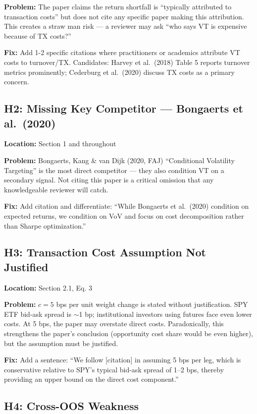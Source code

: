 \documentclass[12pt,a4paper]{article}
\begin{document}
\textbf{Problem:} The paper claims the return shortfall is ``typically attributed to transaction costs'' but does not cite any specific paper making this attribution. This creates a straw man risk --- a reviewer may ask ``who says VT is expensive because of TX costs?''

\textbf{Fix:} Add 1-2 specific citations where practitioners or academics attribute VT costs to turnover/TX. Candidates: Harvey et al.\ (2018) Table 5 reports turnover metrics prominently; Cederburg et al.\ (2020) discuss TX costs as a primary concern.

\subsection*{H2: Missing Key Competitor --- Bongaerts et al.\ (2020)}

\textbf{Location:} Section 1 and throughout

\textbf{Problem:} Bongaerts, Kang \& van Dijk (2020, FAJ) ``Conditional Volatility Targeting'' is the most direct competitor --- they also condition VT on a secondary signal. Not citing this paper is a critical omission that any knowledgeable reviewer will catch.

\textbf{Fix:} Add citation and differentiate: ``While Bongaerts et al.\ (2020) condition on expected returns, we condition on VoV and focus on cost decomposition rather than Sharpe optimization.''

\subsection*{H3: Transaction Cost Assumption Not Justified}

\textbf{Location:} Section 2.1, Eq. 3

\textbf{Problem:} $c = 5$ bps per unit weight change is stated without justification. SPY ETF bid-ask spread is $\sim$1 bp; institutional investors using futures face even lower costs. At 5 bps, the paper may overstate direct costs. Paradoxically, this strengthens the paper's conclusion (opportunity cost share would be even higher), but the assumption must be justified.

\textbf{Fix:} Add a sentence: ``We follow [citation] in assuming 5 bps per leg, which is conservative relative to SPY's typical bid-ask spread of 1--2 bps, thereby providing an upper bound on the direct cost component.''

\subsection*{H4: Cross-OOS Weakness}
\end{document}
